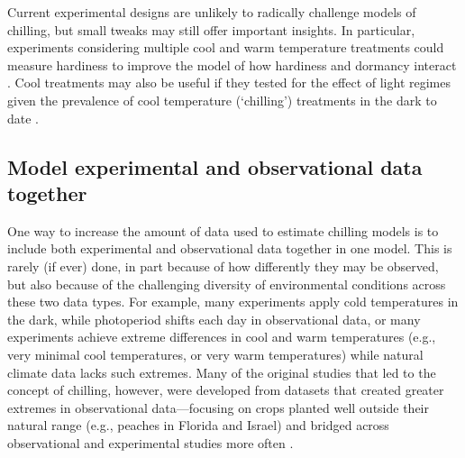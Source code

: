 \documentclass[11pt]{article}
\begin{document}
Current experimental designs are unlikely to radically challenge models of chilling, but small tweaks may still offer important insights. In particular, experiments considering multiple cool and warm temperature treatments could measure hardiness to improve the model of how hardiness and dormancy interact \citep{kovaleskipreprint}. Cool treatments may also be useful if they tested for the effect of light regimes given the prevalence of cool temperature (`chilling') treatments in the dark to date \citep{ospreebbms}. 

\subsection*{Model experimental and observational data together} 
One way to increase the amount of data used to estimate chilling models is to include both experimental and observational data together in one model. This is rarely (if ever) done, in part because of how differently they may be observed, but also because of the challenging diversity of environmental conditions across these two data types. 
For example, many experiments apply cold temperatures in the dark, while photoperiod shifts each day in observational data, or many experiments achieve extreme differences in cool and warm temperatures (e.g., very minimal cool temperatures, or very warm temperatures) while natural climate data lacks such extremes. Many of the original studies that led to the concept of chilling, however, were developed from datasets that created greater extremes in observational data---focusing on crops planted well outside their natural range (e.g., peaches in Florida and Israel) and bridged across observational and experimental studies more often \citep{erez1971,richardson1974}. %
\end{document}
